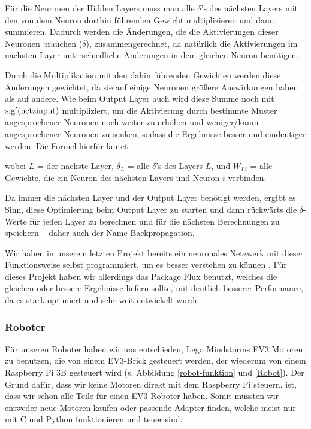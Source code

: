 \documentclass[10pt]{scrartcl}
\begin{document}
	Für die Neuronen der Hidden Layers muss man alle $\delta$'s des nächsten Layers mit den von dem Neuron dorthin führenden Gewicht multiplizieren und dann summieren. Dadurch werden die Änderungen, die die Aktivierungen dieser Neuronen brauchen ($\delta$), zusammengerechnet, da natürlich die Aktivierungen im nächsten Layer unterschiedliche Änderungen in dem gleichen Neuron benötigen.
	
	Durch die Multiplikation mit den dahin führenden Gewichten werden diese Änderungen gewichtet, da sie auf einige Neuronen größere Auswirkungen haben als auf andere. Wie beim Output Layer auch wird diese Summe noch mit $\textrm{sig}'(\textrm{netzinput})$ multipliziert, um die Aktivierung durch bestimmte Muster angesprochener Neuronen noch weiter zu erhöhen und weniger/kaum angesprochener Neuronen zu senken, sodass die Ergebnisse besser und eindeutiger werden. Die Formel hierfür lautet:


	\noindent wobei $L$ = der nächste Layer, $\delta_L$ = alle $\delta$'s des Layers $L$, und $W_{Li}$ = alle Gewichte, die ein Neuron des nächsten Layers und Neuron $i$ verbinden.


	Da immer die nächsten Layer und der Output Layer benötigt werden, ergibt es Sinn, diese Optimierung beim Output Layer zu starten und dann rückwärts die \mbox{$\delta$-Werte} für jeden Layer zu berechnen und für die nächsten Berechnungen zu speichern -- daher auch der Name Backpropagation. \cite{MITNeuronale} \cite{3b1b:nn} \cite{brotcrunsher:backwardpass}


	Wir haben in unserem letzten Projekt bereits ein neuronales Netzwerk mit dieser Funktionsweise selbst programmiert, um es besser verstehen zu können \cite{AIComposer}. Für dieses Projekt haben wir allerdings das Package Flux benutzt, welches die gleichen oder bessere Ergebnisse liefern sollte, mit deutlich besserer Performance, da es stark optimiert und sehr weit entwickelt wurde.

	\subsubsection{Roboter}

	Für unseren Roboter haben wir uns entschieden, Lego Mindstorms EV3 Motoren zu benutzen, die von einem EV3-Brick gesteuert werden, der wiederum von einem Raspberry Pi 3B gesteuert wird (s. Abbildung \ref{robot-funktion} und \ref{Robot}). Der Grund dafür, dass wir keine Motoren direkt mit dem Raspberry Pi steuern, ist, dass wir schon alle Teile für einen EV3 Roboter haben. Somit müssten wir entweder neue Motoren kaufen oder passende Adapter finden, welche meist nur mit C und Python funktionieren und teuer sind.
\end{document}
